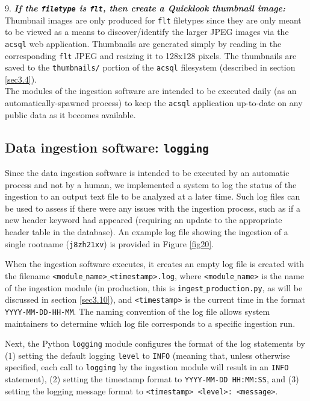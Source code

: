 \documentclass[10pt,journal,compsoc]{IEEEtran}
\begin{document}
9. \textbf{\textit{If the \texttt{filetype} is \texttt{flt}, then create a Quicklook thumbnail image:}} Thumbnail images are only produced for \texttt{flt} filetypes since they
are only meant to be viewed as a means to discover/identify the larger JPEG images via the \texttt{acsql} web application.  Thumbnails are generated simply by reading in the corresponding
\texttt{flt} JPEG and resizing it to 128x128 pixels.  The thumbnails are saved to the \texttt{thumbnails/} portion of the \texttt{acsql} filesystem (described in section \ref{sec3.4}).\\

The modules of the ingestion software are intended to be executed daily (as an automatically-spawned process) to keep the \texttt{acsql} application up-to-date on any public data as it
becomes available.


\subsection{Data ingestion software: \texttt{logging}} \label{sec3.8}

Since the data ingestion software is intended to be executed by an automatic process and not by a human, we implemented a system to log the status of the ingestion to an output text file
to be analyzed at a later time.  Such log files can be used to assess if there were any issues with the ingestion process, such as if a new header keyword had
appeared (requiring an update to the appropriate header table in the database).  An example log file showing the ingestion of a single rootname (\texttt{j8zh21xv}) is provided in Figure
\ref{fig20}.

When the ingestion software executes, it creates an empty log file is created with the filename \texttt{<module$\_$name>$\_$<timestamp>.log}, where \texttt{<module$\_$name>} is the name of the
ingestion module (in production, this is \texttt{ingest$\_$production.py}, as will be discussed in section \ref{sec3.10}), and \texttt{<timestamp>} is the current time in the format
\texttt{YYYY-MM-DD-HH-MM}. The naming convention of the log file allows system maintainers to determine which log file corresponds to a specific ingestion run.

Next, the Python \texttt{logging} module configures the format of the log statements by (1) setting the default logging \texttt{level} to \texttt{INFO} (meaning
that, unless otherwise specified, each call to \texttt{logging} by the ingestion module will result in an \texttt{INFO} statement), (2) setting the timestamp format to
\texttt{YYYY-MM-DD HH:MM:SS}, and (3) setting the logging message format to \texttt{<timestamp> <level>: <message>}.
\end{document}

